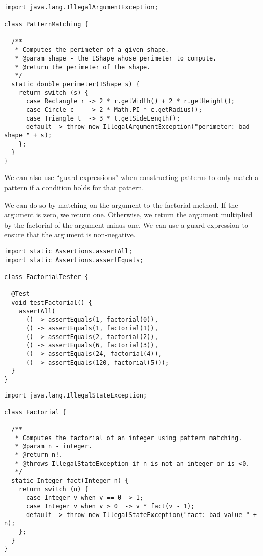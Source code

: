 \enlargethispage{3\baselineskip}
\begin{lstlisting}[language=MyJava]
import java.lang.IllegalArgumentException;

class PatternMatching {

  /**
   * Computes the perimeter of a given shape.
   * @param shape - the IShape whose perimeter to compute.
   * @return the perimeter of the shape.
   */
  static double perimeter(IShape s) {
    return switch (s) {
      case Rectangle r -> 2 * r.getWidth() + 2 * r.getHeight();
      case Circle c    -> 2 * Math.PI * c.getRadius();
      case Triangle t  -> 3 * t.getSideLength();
      default -> throw new IllegalArgumentException("perimeter: bad shape " + s);
    };
  }
}
\end{lstlisting}

We can also use ``guard expressions'' when constructing patterns to only match a pattern if a condition holds for that pattern.

We can do so by matching on the argument to the factorial method. 
If the argument is zero, we return one.
Otherwise, we return the argument multiplied by the factorial of the argument minus one. 
We can use a guard expression to ensure that the argument is non-negative.

\begin{lstlisting}[language=MyJava]
import static Assertions.assertAll;
import static Assertions.assertEquals;

class FactorialTester {

  @Test
  void testFactorial() {
    assertAll(
      () -> assertEquals(1, factorial(0)),
      () -> assertEquals(1, factorial(1)),
      () -> assertEquals(2, factorial(2)),
      () -> assertEquals(6, factorial(3)),
      () -> assertEquals(24, factorial(4)),
      () -> assertEquals(120, factorial(5)));
  }
}
\end{lstlisting}

\begin{lstlisting}[language=MyJava]
import java.lang.IllegalStateException;

class Factorial {

  /**
   * Computes the factorial of an integer using pattern matching.
   * @param n - integer.
   * @return n!.
   * @throws IllegalStateException if n is not an integer or is <0.
   */
  static Integer fact(Integer n) {
    return switch (n) {
      case Integer v when v == 0 -> 1;
      case Integer v when v > 0  -> v * fact(v - 1);
      default -> throw new IllegalStateException("fact: bad value " + n);
    };
  }
}
\end{lstlisting}

